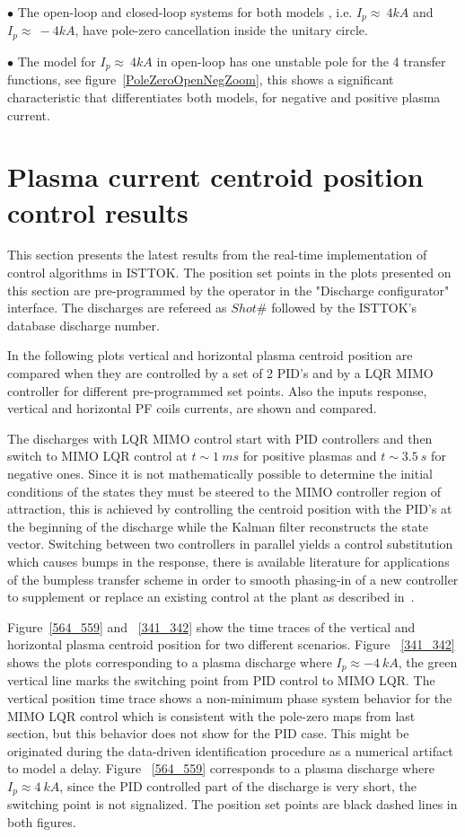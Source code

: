 $\bullet$  The open-loop and closed-loop systems for both models , i.e. $I_p\approx~4kA$ and $I_p\approx~-4kA$, have pole-zero cancellation inside the unitary circle.
\smallskip

$\bullet$  The model for $I_p\approx~4kA$ in open-loop has one unstable pole for the 4 transfer functions, see figure~\ref{PoleZeroOpenNegZoom}, this  shows a significant characteristic that differentiates both models, for negative and positive plasma current.\smallskip

\section{Plasma current centroid position control results}

This section presents the latest results from the real-time implementation of control algorithms in ISTTOK. The position set points  in the plots presented on this section are pre-programmed by the operator in the "Discharge configurator" interface. The discharges are refereed as $Shot \#$ followed by the ISTTOK's database discharge number.\smallskip

In the following plots vertical and horizontal plasma centroid position are compared when they are controlled by a set of 2 PID's and by a LQR MIMO controller for different pre-programmed set points. Also the inputs response, vertical and horizontal PF coils currents, are shown and compared.\smallskip

The discharges with  LQR MIMO control start with PID controllers and then switch to  MIMO LQR control at $t\sim 1~ms$ for positive plasmas and  $t\sim 3.5~s$ for negative ones. Since it is not mathematically possible to determine the initial conditions of the states they must be steered to the MIMO controller region of attraction, this is achieved by controlling the centroid position with the PID's  at the beginning of the discharge while the Kalman filter reconstructs the state vector. Switching between two controllers in parallel yields a control substitution which causes bumps in the response, there is available literature  for applications of the bumpless transfer scheme in order to smooth phasing-in of a new controller to supplement or replace an existing control at the plant as described in~\cite{Bendtsen2005}. \smallskip


Figure~\ref{564_559} and  ~\ref{341_342} show the time traces of the vertical and horizontal plasma centroid position for two different scenarios. Figure ~\ref{341_342} shows the plots corresponding to a plasma discharge where $I_p\approx -4~kA$, the green vertical line marks the switching point from PID control to MIMO LQR. The vertical position time trace shows a non-minimum phase system behavior for the MIMO LQR control which is consistent with the pole-zero maps from last section,  but this behavior does not show for the PID case. This might be originated during the data-driven identification procedure as a numerical artifact to model a delay. Figure ~\ref{564_559} corresponds to a plasma discharge where $I_p\approx 4~kA$, since the  PID controlled part of the discharge is very short, the switching point is not signalized. The position set points are black dashed lines in both figures.\smallskip


